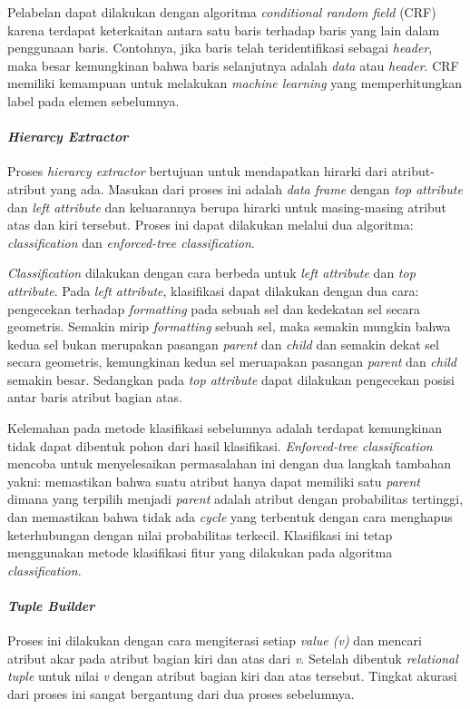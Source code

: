 Pelabelan dapat dilakukan dengan algoritma \textit{conditional random field} (CRF) karena terdapat keterkaitan antara satu baris terhadap baris yang lain dalam penggunaan baris. Contohnya, jika baris telah teridentifikasi sebagai \textit{header}, maka besar kemungkinan bahwa baris selanjutnya adalah \textit{data} atau \textit{header}. CRF memiliki kemampuan untuk melakukan \textit{machine learning} yang memperhitungkan label pada elemen sebelumnya.

\paragraph{\textit{Hierarcy Extractor}}
Proses \textit{hierarcy extractor} \citep{Chen2013} bertujuan untuk mendapatkan hirarki dari atribut-atribut yang ada. Masukan dari proses ini adalah \textit{data frame} dengan \textit{top attribute} dan \textit{left attribute} dan keluarannya berupa hirarki untuk masing-masing atribut atas dan kiri tersebut. Proses ini dapat dilakukan melalui dua algoritma: \textit{classification} dan \textit{enforced-tree classification}.

\textit{Classification} dilakukan dengan cara berbeda untuk \textit{left attribute} dan \textit{top attribute}. Pada \textit{left attribute}, klasifikasi dapat dilakukan dengan dua cara: pengecekan terhadap \textit{formatting} pada sebuah sel dan kedekatan sel secara geometris. Semakin mirip \textit{formatting} sebuah sel, maka semakin mungkin bahwa kedua sel bukan merupakan pasangan \textit{parent} dan \textit{child} dan semakin dekat sel secara geometris, kemungkinan kedua sel meruapakan  pasangan \textit{parent} dan \textit{child} semakin besar. Sedangkan pada \textit{top attribute} dapat dilakukan pengecekan posisi antar baris atribut bagian atas.

Kelemahan pada metode klasifikasi sebelumnya adalah terdapat kemungkinan tidak dapat dibentuk pohon dari hasil klasifikasi. \textit{Enforced-tree classification} mencoba untuk menyelesaikan permasalahan ini dengan dua langkah tambahan yakni: memastikan bahwa suatu atribut hanya dapat memiliki satu \textit{parent} dimana yang terpilih menjadi \textit{parent} adalah atribut dengan probabilitas tertinggi, dan memastikan bahwa tidak ada \textit{cycle} yang terbentuk dengan cara menghapus keterhubungan dengan nilai probabilitas terkecil. Klasifikasi ini tetap menggunakan metode klasifikasi fitur yang dilakukan pada algoritma \textit{classification}.

\paragraph{\textit{Tuple Builder}}
Proses ini dilakukan dengan cara mengiterasi setiap \textit{value (v)} dan mencari atribut akar pada atribut bagian kiri dan atas dari \textit{v}. Setelah dibentuk \textit{relational tuple} untuk nilai \textit{v} dengan atribut bagian kiri dan atas tersebut. Tingkat akurasi dari proses ini sangat bergantung dari dua proses sebelumnya.





